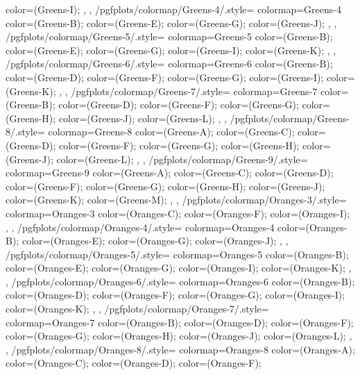 {{{      color=(Greens-I);
    },
  },
  /pgfplots/colormap/Greens-4/.style={
    colormap={Greens-4}{
      color=(Greens-B);
      color=(Greens-E);
      color=(Greens-G);
      color=(Greens-J);
    },
  },
  /pgfplots/colormap/Greens-5/.style={
    colormap={Greens-5}{
      color=(Greens-B);
      color=(Greens-E);
      color=(Greens-G);
      color=(Greens-I);
      color=(Greens-K);
    },
  },
  /pgfplots/colormap/Greens-6/.style={
    colormap={Greens-6}{
      color=(Greens-B);
      color=(Greens-D);
      color=(Greens-F);
      color=(Greens-G);
      color=(Greens-I);
      color=(Greens-K);
    },
  },
  /pgfplots/colormap/Greens-7/.style={
    colormap={Greens-7}{
      color=(Greens-B);
      color=(Greens-D);
      color=(Greens-F);
      color=(Greens-G);
      color=(Greens-H);
      color=(Greens-J);
      color=(Greens-L);
    },
  },
  /pgfplots/colormap/Greens-8/.style={
    colormap={Greens-8}{
      color=(Greens-A);
      color=(Greens-C);
      color=(Greens-D);
      color=(Greens-F);
      color=(Greens-G);
      color=(Greens-H);
      color=(Greens-J);
      color=(Greens-L);
    },
  },
  /pgfplots/colormap/Greens-9/.style={
    colormap={Greens-9}{
      color=(Greens-A);
      color=(Greens-C);
      color=(Greens-D);
      color=(Greens-F);
      color=(Greens-G);
      color=(Greens-H);
      color=(Greens-J);
      color=(Greens-K);
      color=(Greens-M);
    },
  },
  /pgfplots/colormap/Oranges-3/.style={
    colormap={Oranges-3}{
      color=(Oranges-C);
      color=(Oranges-F);
      color=(Oranges-I);
    },
  },
  /pgfplots/colormap/Oranges-4/.style={
    colormap={Oranges-4}{
      color=(Oranges-B);
      color=(Oranges-E);
      color=(Oranges-G);
      color=(Oranges-J);
    },
  },
  /pgfplots/colormap/Oranges-5/.style={
    colormap={Oranges-5}{
      color=(Oranges-B);
      color=(Oranges-E);
      color=(Oranges-G);
      color=(Oranges-I);
      color=(Oranges-K);
    },
  },
  /pgfplots/colormap/Oranges-6/.style={
    colormap={Oranges-6}{
      color=(Oranges-B);
      color=(Oranges-D);
      color=(Oranges-F);
      color=(Oranges-G);
      color=(Oranges-I);
      color=(Oranges-K);
    },
  },
  /pgfplots/colormap/Oranges-7/.style={
    colormap={Oranges-7}{
      color=(Oranges-B);
      color=(Oranges-D);
      color=(Oranges-F);
      color=(Oranges-G);
      color=(Oranges-H);
      color=(Oranges-J);
      color=(Oranges-L);
    },
  },
  /pgfplots/colormap/Oranges-8/.style={
    colormap={Oranges-8}{
      color=(Oranges-A);
      color=(Oranges-C);
      color=(Oranges-D);
      color=(Oranges-F);
}}}
